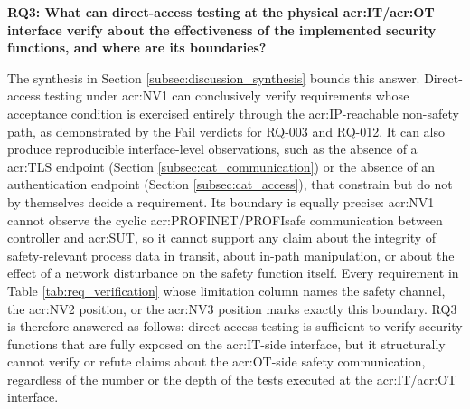 \textbf{RQ3: What can direct-access testing at the physical \gls{acr:IT}/\gls{acr:OT} interface verify about the effectiveness of the implemented security functions, and where are its boundaries?} 

The synthesis in Section \ref{subsec:discussion_synthesis} bounds this answer. Direct-access testing under \gls{acr:NV1} can conclusively verify requirements whose acceptance condition is exercised entirely through the \gls{acr:IP}-reachable non-safety path, as demonstrated by the Fail verdicts for RQ-003 and RQ-012. It can also produce reproducible interface-level observations, such as the absence of a \gls{acr:TLS} endpoint (Section \ref{subsec:cat_communication}) or the absence of an authentication endpoint (Section \ref{subsec:cat_access}), that constrain but do not by themselves decide a requirement. Its boundary is equally precise: \gls{acr:NV1} cannot observe the cyclic \gls{acr:PROFINET}/PROFIsafe communication between controller and \gls{acr:SUT}, so it cannot support any claim about the integrity of safety-relevant process data in transit, about in-path manipulation, or about the effect of a network disturbance on the safety function itself. Every requirement in Table \ref{tab:req_verification} whose limitation column names the safety channel, the \gls{acr:NV2} position, or the \gls{acr:NV3} position marks exactly this boundary. RQ3 is therefore answered as follows: direct-access testing is sufficient to verify security functions that are fully exposed on the \gls{acr:IT}-side interface, but it structurally cannot verify or refute claims about the \gls{acr:OT}-side safety communication, regardless of the number or the depth of the tests executed at the \gls{acr:IT}/\gls{acr:OT} interface.

